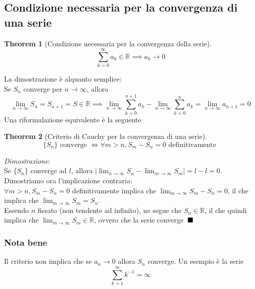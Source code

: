 \documentclass{article}
\newtheorem{theorem}{Theorem}[section]
\newcommand{\qed}{\rule{0.7em}{0.7em}}
\begin{document}
    \subsection{Condizione necessaria per la convergenza di una serie}
        \begin{theorem}[Condizione necessaria per la convergenza della serie]
            $$\sum_{k=0}^\infty a_k \in \mathbb{R} \implies a_k \to 0$$
        \end{theorem}
        La dimostrazione è alquanto semplice: \\
        Se $S_n$ converge per $n \to \infty$, allora 
        $$\lim_{n \to \infty} S_n = S_{n+1} = S \in \mathbb{R} \implies 
            \lim_{n \to \infty} \sum_{k=0}^{n+1} a_k - \lim_{n \to \infty} \sum_{k=0}^{n} a_k = 
            \lim_{n \to \infty} a_{n+1} = 0
        $$
        Una riformulazione equivalente è la seguente
        \begin{theorem}[Criterio di Cauchy per la convergenza di una serie] 
            $$\{S_n\} \textrm{ converge } \iff \forall m > n, S_m - S_n = 0 \textrm{ definitivamente }$$
        \end{theorem}
        \textit{Dimostrazione}: \\
            Se $\{S_n\}$ converge ad $l$, allora $|\lim_{n \to \infty} S_n - \lim_{m \to \infty} S_m| = l - l = 0$. \\
            Dimostriamo ora l'implicazione contraria: \\
            $\forall m > n, S_m - S_n = 0$ definitivamente implica che $\lim_{m \to \infty} S_m - S_n = 0$, 
            il che implica che $\lim_{m \to \infty} S_m = S_n$. \\
            Essendo $n$ fissato (non tendente ad infinito), ne segue che $S_n \in \mathbb{R}$, il che quindi implica che 
            $\lim_{m \to \infty} S_m \in \mathbb{R}$, ovvero che la serie converge $\; \qed$ 
        \subsubsection{Nota bene}
            Il criterio non implica che se $a_n \to 0$ allora $S_n$ converge. Un esempio è la serie 
            $$\sum_{k=1}^\infty k^{-1} = \infty$$
\end{document}
